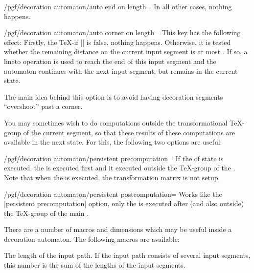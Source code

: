 \begin{command}{\pgfdeclaredecoration{}}
\begin{command}{\state{}}
\begin{key}{/pgf/decoration automaton/auto end on length=}
      In all other cases, nothing happens.
    \end{key}

    \begin{key}{/pgf/decoration automaton/auto corner on length=}
      This key has the following effect: Firstly, the \TeX-if
      |\ifpgfdecoratepathhascorners| is false, nothing
      happens. Otherwise, it is tested whether the remaining distance
      on the current input segment is at most . If so,
      a lineto operation is used to reach the end of this input
      segment and the automaton continues with the next input segment,
      but remains in the current state.

      The main idea behind this option is to avoid having decoration
      segments ``overshoot'' past a corner.
    \end{key}

    You may sometimes wish to do computations outside the
    transformational \TeX-group of the current segment,
    so that these results of these computations are available in the
    next state. For this, the following two options are useful:

    \begin{key}{/pgf/decoration automaton/persistent precomputation=}
      If the  of state is executed, the  is
      executed first and it executed outside the \TeX-group of the
      . Note that when the  is executed, the
      transformation matrix is not setup.
    \end{key}

    \begin{key}{/pgf/decoration automaton/persistent postcomputation=}
      Works like the |persistent precomputation| option, only the
       is executed after (and also outside) the
      \TeX-group of the main .
    \end{key}

    There are a number of macros and dimensions which may be useful
    inside a decoration automaton. The following macros are available:

    \begin{command}{\pgfdecoratedpathlength}
      The length of the input path. If the input path consists of
      several input segments, this number is the sum of the lengths of the
      input segments.
    \end{command}


\end{command}
\end{command}
